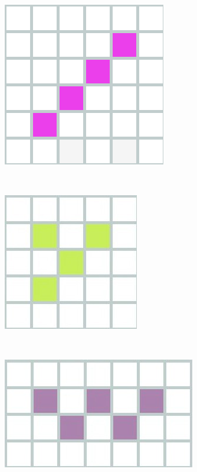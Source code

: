 \begin{figure}[h]
	
	\begin{minipage}{3.5cm}
		\centering
		\includegraphics[scale=0.30]{immagini/i}
		\caption{}
		\label{i}
	\end{minipage}
	\ \hspace{2mm} \hspace{3mm} \
	\begin{minipage}{3.5cm}
		\centering
		\includegraphics[scale=0.25]{immagini/T}
		\caption{}
		\label{t}
	\end{minipage}
	\ \hspace{2mm} \hspace{3mm} \
	\begin{minipage}{3.5cm}
		\centering
		\includegraphics[scale=0.25]{immagini/w}
		\caption{}
		\label{w}
	\end{minipage}
\end{figure}

